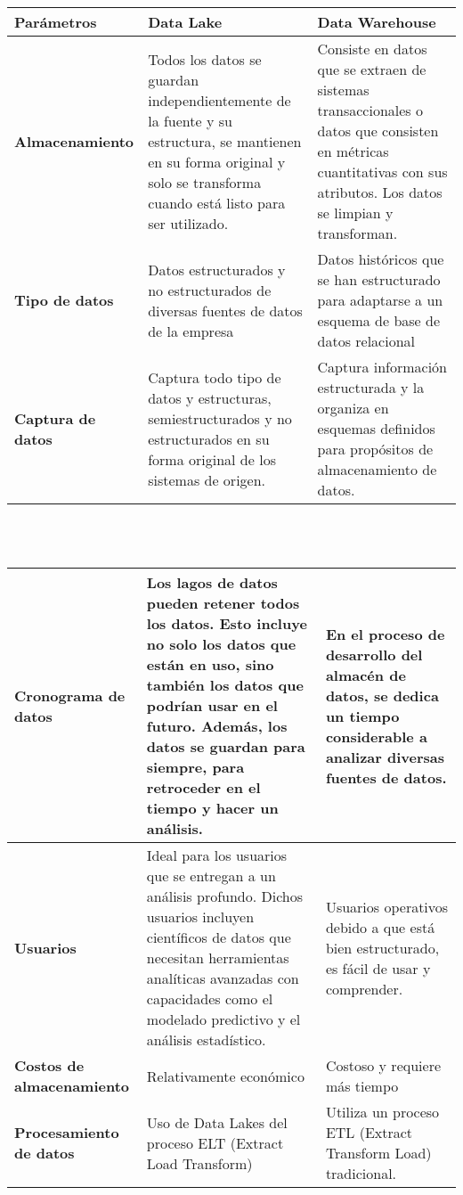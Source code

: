 \documentclass[11pt,twocolumn]{article}
\begin{document}
\begin{tabular}{ | m{8em} | m{6em}| m{6em} | } 
\hline
\textbf{Par\'ametros} & \textbf{Data Lake} & \textbf{Data Warehouse} \\
\hline
 \textbf{Almacenamiento} & Todos los datos se guardan independientemente de la fuente y su estructura, se mantienen en su forma original y solo se transforma cuando est\'a listo para ser utilizado. & Consiste en datos que se extraen de sistemas transaccionales o datos que consisten en métricas cuantitativas con sus atributos. Los datos se limpian y transforman. \\
\hline
 \textbf{Tipo de datos} & Datos estructurados y no estructurados de diversas fuentes de datos de la empresa & Datos históricos que se han estructurado para adaptarse a un esquema de base de datos relacional \\
 \hline
 \textbf{Captura de datos} & Captura todo tipo de datos y estructuras, semiestructurados y no estructurados en su forma original de los sistemas de origen. & Captura información estructurada y la organiza en esquemas definidos para propósitos de almacenamiento de datos. \\
  \hline
 \end{tabular}
 \\\\
 \begin{tabular}{ | m{7em} | m{6.5em}| m{5.8em} | } 
  \hline
 \textbf{Cronograma de datos} & Los lagos de datos pueden retener todos los datos. Esto incluye no solo los datos que están en uso, sino también los datos que podrían usar en el futuro. Además, los datos se guardan para siempre, para retroceder en el tiempo y hacer un análisis. & En el proceso de desarrollo del almacén de datos, se dedica un tiempo considerable a analizar diversas fuentes de datos. \\
 
 
 \hline
 \textbf{Usuarios} & Ideal para los usuarios que se entregan a un análisis profundo. Dichos usuarios incluyen científicos de datos que necesitan herramientas analíticas avanzadas con capacidades como el modelado predictivo y el análisis estadístico. & Usuarios operativos debido a que está bien estructurado, es fácil de usar y comprender. \\
 \hline
 \textbf{Costos de almacenamiento} & Relativamente económico  & Costoso y requiere más tiempo \\
  \hline
 \textbf{Procesamiento de datos} & Uso de Data Lakes del proceso ELT (Extract Load Transform) & Utiliza un proceso ETL (Extract Transform Load) tradicional. \\
 
  \hline
 \end{tabular}
\end{document}
